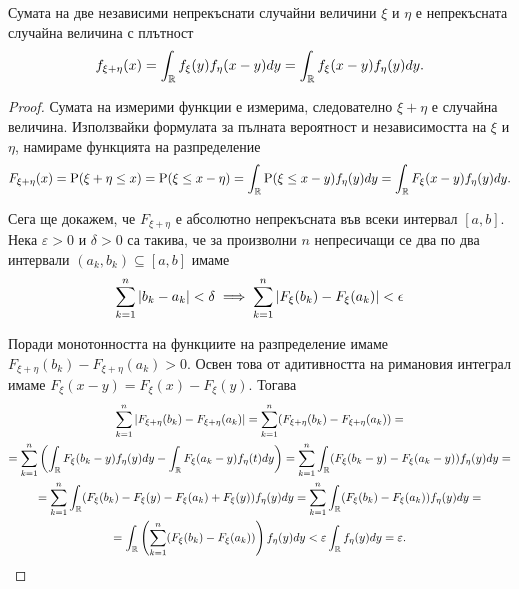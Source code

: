 \documentclass[numbers=endperiod, DIV=15, bibliography=totocnumbered]{scrartcl}
\begin{document}
\begin{proposition}\label{thm:convolution}
  Сумата на две независими непрекъснати случайни величини $\xi$ и $\eta$ е непрекъсната случайна величина с плътност
  \begin{displaymath}
    f_{\xi + \eta} (x)
    =
    \int_{\mathbb{R}} f_\xi(y) f_\eta(x - y) dy
    =
    \int_{\mathbb{R}} f_\xi(x - y) f_\eta(y) dy.
  \end{displaymath}
\end{proposition}
\begin{proof} Сумата на измерими функции е измерима, следователно $\xi + \eta$ е случайна величина. Използвайки формулата за пълната вероятност и независимостта на $\xi$ и $\eta$, намираме функцията на разпределение
  \begin{displaymath}
    F_{\xi + \eta} (x)
    =
    \operatorname{P}(\xi + \eta \leq x)
    =
    \operatorname{P}(\xi \leq x - \eta)
    =
    \int_{\mathbb{R}} \operatorname{P}(\xi \leq x - y) f_\eta(y) dy
    =
    \int_{\mathbb{R}} F_\xi(x - y) f_\eta(y) dy.
  \end{displaymath}

  Сега ще докажем, че $F_{\xi + \eta}$ е абсолютно непрекъсната във всеки интервал $[a, b]$. Нека $\varepsilon > 0$ и $\delta > 0$ са такива, че за произволни $n$ непресичащи се два по два интервали $(a_k, b_k) \subseteq [a, b]$ имаме
  \begin{displaymath}
    \sum_{k=1}^n \left\vert b_k - a_k \right\vert < \delta
    \implies
    \sum_{k=1}^n \left\vert F_\xi(b_k) - F_\xi(a_k) \right\vert < \epsilon
  \end{displaymath}

  Поради монотонността на функциите на разпределение имаме  $F_{\xi+\eta} (b_k) - F_{\xi+\eta}(a_k) > 0$. Освен това от адитивността на римановия интеграл имаме $F_\xi(x - y) = F_\xi(x) - F_\xi(y)$. Тогава
  \begin{multline*}
    \sum_{k=1}^n \left\vert F_{\xi+\eta} (b_k) - F_{\xi+\eta}(a_k) \right\vert
    =
    \sum_{k=1}^n (F_{\xi+\eta} (b_k) - F_{\xi+\eta}(a_k))
    = \\ =
    \sum_{k=1}^n \left(\int_{\mathbb{R}} F_\xi(b_k - y) f_\eta(y) dy - \int_{\mathbb{R}} F_\xi(a_k - y) f_\eta(t) dy \right)
    =
    \sum_{k=1}^n \int_{\mathbb{R}} (F_\xi(b_k - y) - F_\xi(a_k - y)) f_\eta(y) dy
    = \\ =
    \sum_{k=1}^n \int_{\mathbb{R}} (F_\xi(b_k) - F_\xi(y) - F_\xi(a_k) + F_\xi(y)) f_\eta(y) dy
    =
    \sum_{k=1}^n \int_{\mathbb{R}} (F_\xi(b_k) - F_\xi(a_k)) f_\eta(y) dy
    = \\ =
    \int_{\mathbb{R}} \left(\sum_{k=1}^n (F_\xi(b_k) - F_\xi(a_k)) \right) f_\eta(y) dy
    <
    \varepsilon \int_{\mathbb{R}} f_\eta(y) dy
    =
    \varepsilon.
  \end{multline*}


\end{proof}
\end{document}
